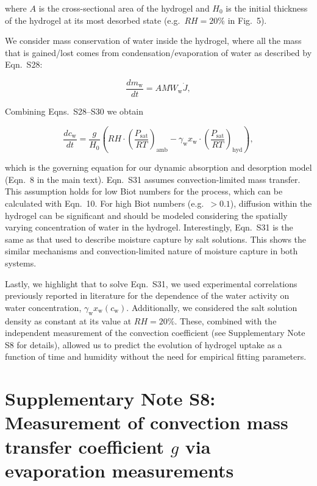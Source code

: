 \documentclass[11pt]{article}
\begin{document}
where $A$ is the cross-sectional area of the hydrogel and $H_0$ is the initial thickness of the hydrogel at its most desorbed state (e.g.\ $RH=20\%$ in Fig.~5).

We consider mass conservation of water inside the hydrogel, where all the mass that is gained/lost comes from condensation/evaporation of water as described by Eqn.~S28:

\begin{equation}
\frac{dm_\mathrm{w}}{dt} = A MW_\mathrm{w} \dot{J}, \tag{S30}
\end{equation}

Combining Eqns.~S28--S30 we obtain

\begin{equation}
\frac{dc_\mathrm{w}}{dt} = \frac{g}{H_0}\left(RH \cdot \left(\frac{P_\mathrm{sat}}{RT}\right)_\mathrm{amb} - \gamma_\mathrm{w} x_\mathrm{w} \cdot \left(\frac{P_\mathrm{sat}}{RT}\right)_\mathrm{hyd}\right), \tag{S31}
\end{equation}

which is the governing equation for our dynamic absorption and desorption model (Eqn.~8 in the main text). Eqn.~S31 assumes convection-limited mass transfer. This assumption holds for low Biot numbers for the process, which can be calculated with Eqn.~10. For high Biot numbers (e.g.\ $>0.1$), diffusion within the hydrogel can be significant and should be modeled considering the spatially varying concentration of water in the hydrogel.\cite{graeber2023nano} Interestingly, Eqn.~S31 is the same as that used to describe moisture capture by salt solutions.\cite{diazmarin2024} This shows the similar mechanisms and convection-limited nature of moisture capture in both systems.

Lastly, we highlight that to solve Eqn.~S31, we used experimental correlations previously reported in literature for the dependence of the water activity on water concentration, $\gamma_\mathrm{w} x_\mathrm{w}(c_\mathrm{w})$.\cite{conde2004,palacios2012} Additionally, we considered the salt solution density as constant at its value at $RH=20\%$. These, combined with the independent measurement of the convection coefficient (see Supplementary Note S8 for details), allowed us to predict the evolution of hydrogel uptake as a function of time and humidity without the need for empirical fitting parameters.

\clearpage

\section*{Supplementary Note S8: Measurement of convection mass transfer coefficient $g$ via evaporation measurements}
\end{document}
